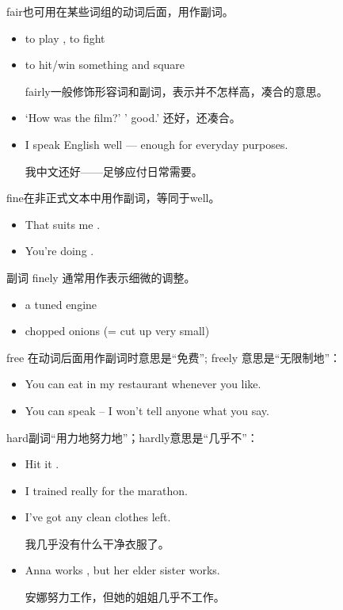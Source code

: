 fair也可用在某些词组的动词后面，用作副词。
\begin{itemize}
\item to play , to fight 
\item to hit/win something  and square

  fairly一般修饰形容词和副词，表示并不怎样高，凑合的意思。

\item `How was the film?' ' good.' 还好，还凑合。

\item I speak English  well --- enough for everyday purposes.

  我中文还好——足够应付日常需要。
\end{itemize}


fine在非正式文本中用作副词，等同于well。
\begin{itemize}
\item That suits me .

\item You're doing .
\end{itemize}
副词 finely 通常用作表示细微的调整。
\begin{itemize}
\item a  tuned engine

\item {} chopped onions (= cut up very small)
\end{itemize}

free 在动词后面用作副词时意思是“免费”; freely 意思是“无限制地”：
\begin{itemize}
\item You can eat  in my restaurant whenever you like.

\item You can speak  – I won't tell anyone what you say.
\end{itemize}

hard副词“用力地努力地”；hardly意思是“几乎不”：
\begin{itemize}
\item Hit it .
\item I trained really  for the marathon.
\item I've  got any clean clothes left.

  我几乎没有什么干净衣服了。
\item Anna works , but her elder sister  works.

  安娜努力工作，但她的姐姐几乎不工作。
\end{itemize}

